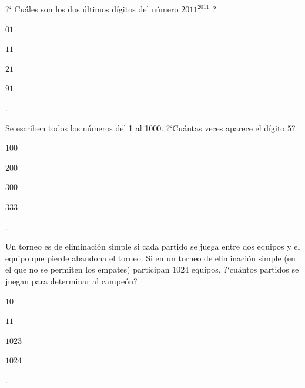 \begin{Problema}{3}
  ?` Cu\'ales son los dos \'ultimos d\'igitos del n\'umero $2011^{2011}$ ?

  \begin{inparaenum}
  \item $01$ \esp
  \item $11$ \esp
  \item $21$ \esp
  \item $91$ \esp
  \item \nota.
  \end{inparaenum}
\end{Problema}

\begin{Solucion}
  
\end{Solucion}

\begin{Problema}{4}
  Se escriben todos los n\'umeros del 1 al 1000. ?`Cu\'antas veces
  aparece el d\'igito $5$?

  \begin{inparaenum}
  \item $100$ \esp
  \item $200$ \esp
  \item $300$ \esp
  \item $333$ \esp
  \item \nota.
  \end{inparaenum}
\end{Problema}

\begin{Solucion}
  
\end{Solucion}

\begin{Problema}{5}
  Un torneo es de eliminaci\'on simple si cada partido se juega entre
  dos equipos y el equipo que pierde abandona el torneo.  Si en un
  torneo de eliminaci\'on simple (en el que no se permiten los
  empates) participan $1024$ equipos, ?`cu\'antos partidos se juegan
  para determinar al campe\'on?

  \begin{inparaenum}
  \item $10$ \esp
  \item $11$ \esp
  \item $1023$ \esp
  \item $1024$ \esp
  \item \nota.
  \end{inparaenum}
\end{Problema}

